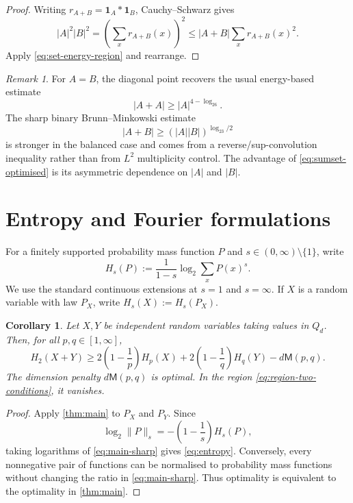 \documentclass[11pt,reqno]{amsart}
\numberwithin{equation}{section}
\newtheorem{corollary}[corollary]{Corollary}
\theoremstyle{definition}
\theoremstyle{remark}
\newtheorem{remark}[remark]{Remark}
\newcommand{\one}{\mathbf 1}
\newcommand{\Mu}{\mathsf M}
\newcommand{\logtwo}{\log_2}
\begin{document}
\begin{proof}
Writing $r_{A+B}=\one_A*\one_B$, Cauchy--Schwarz gives
\[
  |A|^2|B|^2
  =\left(\sum_x r_{A+B}(x)\right)^2
  \le |A+B|\sum_xr_{A+B}(x)^2.
\]
Apply \eqref{eq:set-energy-region} and rearrange.
\end{proof}

\begin{remark}
For $A=B$, the diagonal point recovers the usual energy-based estimate
\[
  |A+A|\ge |A|^{4-\logtwo6}.
\]
The sharp binary Brunn--Minkowski estimate
\[
  |A+B|\ge(|A||B|)^{\logtwo3/2}
\]
is stronger in the balanced case and comes from a reverse/sup-convolution inequality rather than from $L^2$ multiplicity control.  The advantage of \eqref{eq:sumset-optimised} is its asymmetric dependence on $|A|$ and $|B|$.
\end{remark}

\section{Entropy and Fourier formulations}\label{sec:entropy-fourier}

For a finitely supported probability mass function $P$ and $s\in(0,\infty)\setminus\{1\}$, write
\[
  H_s(P):=\frac1{1-s}\logtwo\sum_xP(x)^s.
\]
We use the standard continuous extensions at $s=1$ and $s=\infty$.  If $X$ is a random variable with law $P_X$, write $H_s(X):=H_s(P_X)$.

\begin{corollary}\label{cor:entropy}
Let $X,Y$ be independent random variables taking values in $Q_d$.  Then, for all $p,q\in[1,\infty]$,
\begin{equation}\label{eq:entropy}
  H_2(X+Y)
  \ge
  2\left(1-\frac1p\right)H_p(X)
  +2\left(1-\frac1q\right)H_q(Y)
  -d\Mu(p,q).
\end{equation}
The dimension penalty $d\Mu(p,q)$ is optimal.  In the region \eqref{eq:region-two-conditions}, it vanishes.
\end{corollary}

\begin{proof}
Apply \cref{thm:main} to $P_X$ and $P_Y$.  Since
\[
  \logtwo\|P\|_s
  =-\left(1-\frac1s\right)H_s(P),
\]
taking logarithms of \eqref{eq:main-sharp} gives \eqref{eq:entropy}.  Conversely, every nonnegative pair of functions can be normalised to probability mass functions without changing the ratio in \eqref{eq:main-sharp}.  Thus optimality is equivalent to the optimality in \cref{thm:main}.
\end{proof}
\end{document}
